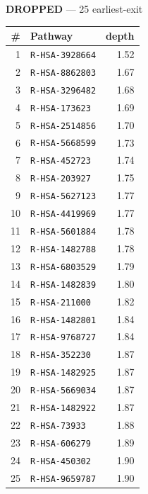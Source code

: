 \documentclass[10pt]{article}
\begin{document}
\begin{minipage}[t]{0.48\textwidth}\centering\textbf{\color{red!60!black}DROPPED} --- 25 earliest-exit\\[3pt]
\begin{tabular}{@{}r l r@{}}
\toprule
\# & Pathway & depth \\
\midrule
1 & \texttt{R-HSA-3928664} & 1.52 \\
2 & \texttt{R-HSA-8862803} & 1.67 \\
3 & \texttt{R-HSA-3296482} & 1.68 \\
4 & \texttt{R-HSA-173623} & 1.69 \\
5 & \texttt{R-HSA-2514856} & 1.70 \\
6 & \texttt{R-HSA-5668599} & 1.73 \\
7 & \texttt{R-HSA-452723} & 1.74 \\
8 & \texttt{R-HSA-203927} & 1.75 \\
9 & \texttt{R-HSA-5627123} & 1.77 \\
10 & \texttt{R-HSA-4419969} & 1.77 \\
11 & \texttt{R-HSA-5601884} & 1.78 \\
12 & \texttt{R-HSA-1482788} & 1.78 \\
13 & \texttt{R-HSA-6803529} & 1.79 \\
14 & \texttt{R-HSA-1482839} & 1.80 \\
15 & \texttt{R-HSA-211000} & 1.82 \\
16 & \texttt{R-HSA-1482801} & 1.84 \\
17 & \texttt{R-HSA-9768727} & 1.84 \\
18 & \texttt{R-HSA-352230} & 1.87 \\
19 & \texttt{R-HSA-1482925} & 1.87 \\
20 & \texttt{R-HSA-5669034} & 1.87 \\
21 & \texttt{R-HSA-1482922} & 1.87 \\
22 & \texttt{R-HSA-73933} & 1.88 \\
23 & \texttt{R-HSA-606279} & 1.89 \\
24 & \texttt{R-HSA-450302} & 1.90 \\
25 & \texttt{R-HSA-9659787} & 1.90 \\
\bottomrule
\end{tabular}
\end{minipage}
\end{document}
